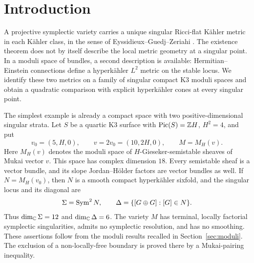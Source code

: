 \section{Introduction}\label{sec:introduction}

A projective symplectic variety carries a unique singular Ricci-flat
K\"ahler metric in each K\"ahler class, in the sense of
Eyssidieux--Guedj--Zeriahi \cite[Theorem~7.5 and Corollary~7.6]{egz09}.
The existence theorem does not by itself describe the local metric
geometry at a singular point. In a moduli space of bundles, a second
description is available: Hermitian--Einstein connections define a
hyperk\"ahler $L^2$ metric on the stable locus. We identify these two
metrics on a family of singular compact K3 moduli spaces and obtain
a quadratic comparison with explicit hyperk\"ahler cones at every
singular point.

The simplest example is already a compact space with two
positive-dimensional singular strata. Let $S$ be a quartic K3 surface
with $\operatorname{Pic}(S)=\mathbb Z H$, $H^2=4$, and put
\begin{equation}\label{eq:quartic}
 v_0=(5,H,0),\qquad v=2v_0=(10,2H,0),\qquad M=M_H(v).
\end{equation}
Here $M_H(v)$ denotes the moduli space of $H$-Gieseker-semistable
sheaves of Mukai vector $v$. This space has complex dimension $18$.
Every semistable sheaf is a vector bundle, and its slope
Jordan--H\"older factors are vector bundles as well. If
$N=M_H(v_0)$, then $N$ is a smooth compact hyperk\"ahler sixfold,
and the singular locus and its diagonal are
\begin{equation}\label{eq:quartic-strata}
 \Sigma=\operatorname{Sym}^2N,\qquad \Delta=\{[G\oplus G]:[G]\in N\}.
\end{equation}
Thus $\dim_{\mathbb C}\Sigma=12$ and $\dim_{\mathbb C}\Delta=6$.
The variety $M$ has terminal, locally factorial symplectic
singularities, admits no symplectic resolution, and has no smoothing.
These assertions follow from the moduli results recalled in
Section~\ref{sec:moduli}. The exclusion of a non-locally-free
boundary is proved there by a Mukai-pairing inequality.

